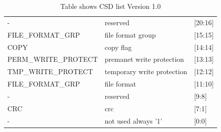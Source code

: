 \documentclass[]{article}
\begin{document}
\begin{table}[h]
{\begin{tabular}{|l|l|l|}
	-&reserved&[20:16]  \\
	FILE\_FORMAT\_GRP&file format group&[15:15] \\
	COPY&copy flag&[14:14] \\
	PERM\_WRITE\_PROTECT&premanet write protection&[13:13] \\
	TMP\_WRITE\_PROTECT&temporary write protection&[12:12] \\
	FILE\_FORMAT\_GRP&file format&[11:10] \\
	-&reserved&[9:8] \\
	CRC&crc&[7:1] \\
	-&not used always '1'&[0:0] \\
\end{tabular}%
}
\caption{Table shows CSD list Version 1.0}
\label{table:cs12.0}
\end{table}
\end{document}
